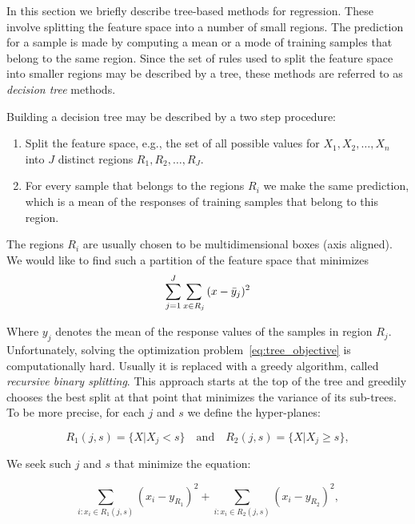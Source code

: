 In this section we briefly describe tree-based methods for regression.
These involve splitting the feature space into a number of small
regions.  The prediction for a sample is made by computing a mean or a
mode of training samples that belong to the same region.  Since the
set of rules used to split the feature space into smaller regions may
be described by a tree, these methods are referred to as
\textit{decision tree} methods.

Building a decision tree may be described by a two step procedure:
\begin{enumerate}
\item Split the feature space, e.g., the set of all possible values
  for $X_1, X_2,\ldots,X_n$ into $J$ distinct regions $R_1, R_2,\ldots, R_J$.
\item For every sample that belongs to the regions $R_i$ we make the
  same prediction, which is a mean of the responses of training
  samples that belong to this region.
\end{enumerate}

The regions $R_i$ are usually chosen to be multidimensional boxes (axis aligned).  We would like to find such a partition of the feature space that minimizes
\begin{equation}\label{eq:tree_objective}
\sum\limits_{j=1}^J\sum_{x\in R_j}{(x-\bar{y}_j)^2}
\end{equation}

Where $y_j$ denotes the mean of the response values of the
samples in region $R_j$.  Unfortunately, solving the optimization
problem~\ref{eq:tree_objective} is computationally hard.  Usually it
is replaced with a greedy algorithm, called \textit{recursive binary
  splitting}.  This approach starts at the top of the tree and
greedily chooses the best split at that point that minimizes the
variance of its sub-trees.  To be more precise, for each $j$ and $s$ we
define the hyper-planes:

\begin{equation}
  R_1(j,s) = \{ X\lvert X_j<s \}\quad\text{and}\quad R_2(j,s) = \{ X\lvert X_j \geq s \},
\end{equation}

We seek such $j$ and $s$ that minimize the equation:

\begin{equation}
  \sum\limits_{i:x_i\in R_1(j,s)}{(x_i-y_{R_1})}^2 + \sum\limits_{i:x_i\in R_2(j,s)}{(x_i-y_{R_2})}^2,
\end{equation}

